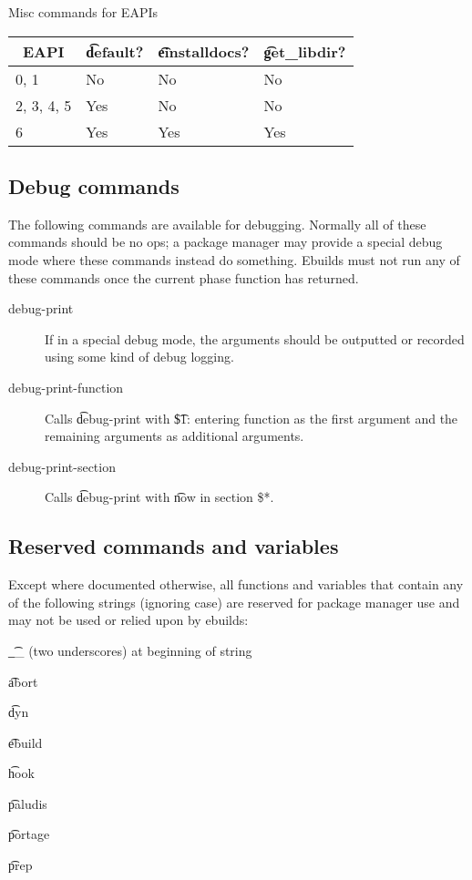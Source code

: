 \begin{centertable}{Misc commands for EAPIs}
    \label{tab:misc-commands}
    \begin{tabular}{llll}
      \toprule
      \multicolumn{1}{c}{\textbf{EAPI}} &
      \multicolumn{1}{c}{\textbf{\t{default}?}} &
      \multicolumn{1}{c}{\textbf{\t{einstalldocs}?}} &
      \multicolumn{1}{c}{\textbf{\t{get_libdir}?}} \\
      \midrule
      0, 1              & No  & No  & No  \\
      2, 3, 4, 5        & Yes & No  & No  \\
      6                 & Yes & Yes & Yes \\
      \bottomrule
    \end{tabular}
\end{centertable}

\subsection{Debug commands}
The following commands are available for debugging. Normally all of these commands should be no ops;
a package manager may provide a special debug mode where these commands instead do something.
Ebuilds must not run any of these commands once the current phase function has returned.

\begin{description}
\item[debug-print] If in a special debug mode, the arguments should be outputted or recorded using
    some kind of debug logging.
\item[debug-print-function] Calls \t{debug-print} with \t{\$1: entering function} as the first
    argument and the remaining arguments as additional arguments.
\item[debug-print-section] Calls \t{debug-print} with \t{now in section \$*}.
\end{description}

\subsection{Reserved commands and variables}

Except where documented otherwise, all functions and variables that contain any of the following
strings (ignoring case) are reserved for package manager use and may not be used or relied upon by
ebuilds:

\begin{compactitem}
\item \t{__} (two underscores) at beginning of string
\item \t{abort}
\item \t{dyn}
\item \t{ebuild}
\item \t{hook}
\item \t{paludis}
\item \t{portage}
\item \t{prep}
\end{compactitem}


